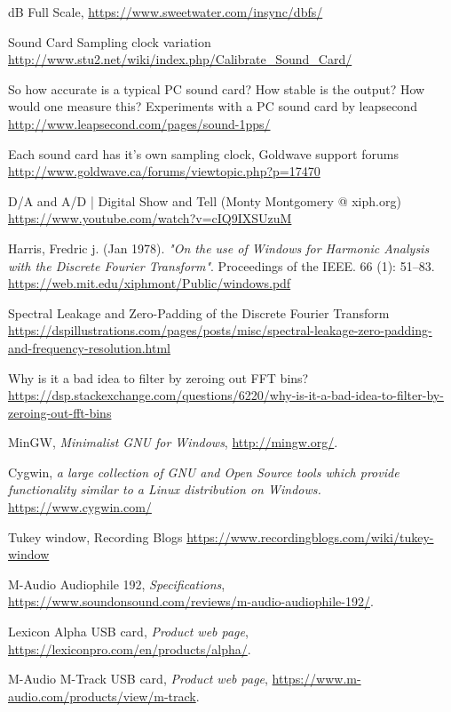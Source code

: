 \documentclass[10pt,a4paper]{report}
\begin{document}
\begin{thebibliography}{9}
	dB Full Scale, 
	\url{https://www.sweetwater.com/insync/dbfs/}
	
	Sound Card Sampling clock variation
	\url{http://www.stu2.net/wiki/index.php/Calibrate_Sound_Card/}
	
	So how accurate is a typical PC sound card? How stable is the output? How would one measure this?
	Experiments with a PC sound card by leapsecond
	\url{http://www.leapsecond.com/pages/sound-1pps/}
	
	Each sound card has it's own sampling clock, Goldwave support forums
	\url{http://www.goldwave.ca/forums/viewtopic.php?p=17470}
	
	D/A and A/D | Digital Show and Tell (Monty Montgomery @ xiph.org)
	\url{https://www.youtube.com/watch?v=cIQ9IXSUzuM}
	
	Harris, Fredric j. (Jan 1978). \textit{"On the use of Windows for Harmonic Analysis with the Discrete Fourier Transform"}. Proceedings of the IEEE. 66 (1): 51–83.
	\url{https://web.mit.edu/xiphmont/Public/windows.pdf}
	
	Spectral Leakage and Zero-Padding of the Discrete Fourier Transform
	\url{https://dspillustrations.com/pages/posts/misc/spectral-leakage-zero-padding-and-frequency-resolution.html}
	
	Why is it a bad idea to filter by zeroing out FFT bins?
	\url{https://dsp.stackexchange.com/questions/6220/why-is-it-a-bad-idea-to-filter-by-zeroing-out-fft-bins}
	
	MinGW, 
	\textit{Minimalist GNU for Windows},
	\url{http://mingw.org/}.
	
	Cygwin,
	\textit{a large collection of GNU and Open Source tools which provide functionality similar to a Linux distribution on Windows.}
	\url{https://www.cygwin.com/}
	
	Tukey window, Recording Blogs
	\url{https://www.recordingblogs.com/wiki/tukey-window}
	
	M-Audio Audiophile 192,
	\textit{Specifications},
	\url{https://www.soundonsound.com/reviews/m-audio-audiophile-192/}.
	
	Lexicon Alpha USB card,
	\textit{Product web page},
	\url{https://lexiconpro.com/en/products/alpha/}.
	
	M-Audio M-Track USB card,
	\textit{Product web page},
	\url{	https://www.m-audio.com/products/view/m-track}.
	

\end{thebibliography}
\end{document}
